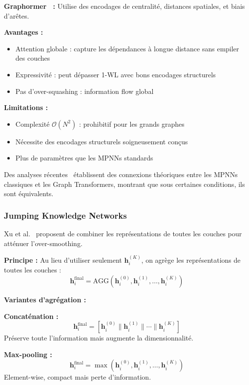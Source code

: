 \textbf{Graphormer~\cite{Ying2021} :}
Utilise des encodages de centralité, distances spatiales, et biais d'arêtes.

\textbf{Avantages :}
\begin{itemize}
    \item Attention globale : capture les dépendances à longue distance sans empiler des couches
    \item Expressivité : peut dépasser 1-WL avec bons encodages structurels
    \item Pas d'over-squashing : information flow global
\end{itemize}

\textbf{Limitations :}
\begin{itemize}
    \item Complexité $\mathcal{O}(N^2)$ : prohibitif pour les grands graphes
    \item Nécessite des encodages structurels soigneusement conçus
    \item Plus de paramètres que les MPNNs standards
\end{itemize}

Des analyses récentes~\cite{Cai2023} établissent des connexions théoriques entre les MPNNs classiques et les Graph Transformers, montrant que sous certaines conditions, ils sont équivalents.

\subsubsection{Jumping Knowledge Networks}

Xu et al.~\cite{Xu2018} proposent de combiner les représentations de toutes les couches pour atténuer l'over-smoothing.

\textbf{Principe :}
Au lieu d'utiliser seulement $\mathbf{h}_i^{(K)}$, on agrège les représentations de toutes les couches :
\[
\mathbf{h}_i^{\text{final}} = \text{AGG}\left(\mathbf{h}_i^{(0)}, \mathbf{h}_i^{(1)}, \ldots, \mathbf{h}_i^{(K)}\right)
\]

\textbf{Variantes d'agrégation :}

\textbf{Concaténation :}
\[
\mathbf{h}_i^{\text{final}} = [\mathbf{h}_i^{(0)} \| \mathbf{h}_i^{(1)} \| \cdots \| \mathbf{h}_i^{(K)}]
\]
Préserve toute l'information mais augmente la dimensionnalité.

\textbf{Max-pooling :}
\[
\mathbf{h}_i^{\text{final}} = \max\left(\mathbf{h}_i^{(0)}, \mathbf{h}_i^{(1)}, \ldots, \mathbf{h}_i^{(K)}\right)
\]
Element-wise, compact mais perte d'information.

